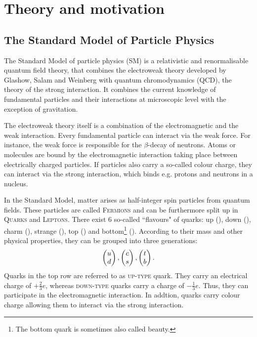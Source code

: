 \chapter{Theory and motivation}
\label{sec:Theory}

\section{The Standard Model of Particle Physics}
The Standard Model of particle physics (SM) is a relativistic and renormalisable quantum field theory, that combines the electroweak theory developed by Glashow, Salam and Weinberg \cite{SM_Glashow, SM_Salam, SM_Weinberg} with quantum chromodynamics (QCD), the theory of the strong interaction.
It combines the current knowledge of fundamental particles and their interactions at microscopic level with the exception of gravitation.

The electroweak theory itself is a combination of the electromagnetic and the weak interaction.
Every fundamental particle can interact via the weak force.
For instance, the weak force is responsible for the $\beta$-decay of neutrons.
Atoms or molecules are bound by the electromagnetic interaction taking place between electrically charged particles.
If particles also carry a so-called colour charge, they can interact via the strong interaction, which binds e.g. protons and neutrons in a nucleus.

In the Standard Model, matter arises as half-integer spin particles from quantum fields.
These particles are called \textsc{Fermions} and can be furthermore split up in \textsc{Quarks} and \textsc{Leptons}.
There exist 6 so-called ``flavours" of quarks: up (\uquark), down (\cquark), charm (\cquark), strange (\squark), top (\tquark) and bottom\footnote{The bottom quark is sometimes also called beauty.} (\bquark).
According to their mass and other physical properties, they can be grouped into three generations:
\begin{align*}
    \begin{pmatrix} {\ensuremath{u}} \\ {d} \end{pmatrix},
    \begin{pmatrix} {\ensuremath{c}} \\ {s} \end{pmatrix},
    \begin{pmatrix} {\ensuremath{t}} \\ {b} \end{pmatrix}.
\end{align*}
Quarks in the top row are referred to as \textsc{up-type} quark.
They carry an electrical charge of $+\frac{2}{3}e$, whereas \textsc{down-type} quarks carry a charge of $-\frac{1}{3}e$.
Thus, they can participate in the electromagnetic interaction.
In addtion, quarks carry colour charge allowing them to interact via the strong interaction.

